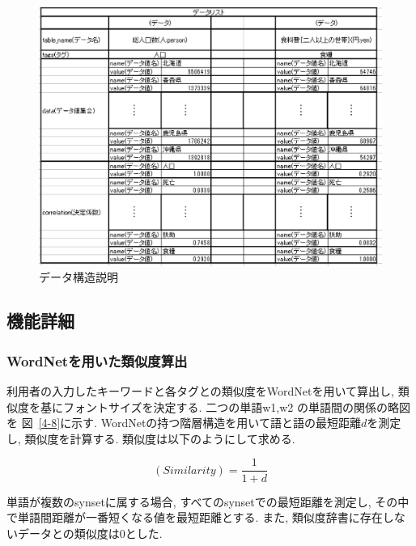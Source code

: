 \documentclass[sotsuron]{kuee}
\begin{document}
\begin{figure}
  \begin{center}
    \unitlength=1mm
   \includegraphics[width=120mm]{fig4-13.eps}
  \end{center}
  \caption{データ構造説明}
  \label{4-13}
\end{figure}


\subsection{機能詳細}



\subsubsection{WordNetを用いた類似度算出}

利用者の入力したキーワードと各タグとの類似度をWordNetを用いて算出し, 類似度を基にフォントサイズを決定する.
二つの単語w1,w2 の単語間の関係の略図を
図~\ref{4-8}に示す.
WordNetの持つ階層構造を用いて語と語の最短距離$d$を測定し, 類似度を計算する.
類似度は以下のようにして求める.

\begin{equation}
(Similarity) = \frac{1}{1 + d}
\end{equation}

単語が複数のsynsetに属する場合, すべてのsynsetでの最短距離を測定し, その中で単語間距離が一番短くなる値を最短距離とする.
また, 類似度辞書に存在しないデータとの類似度は0とした.
\end{document}
